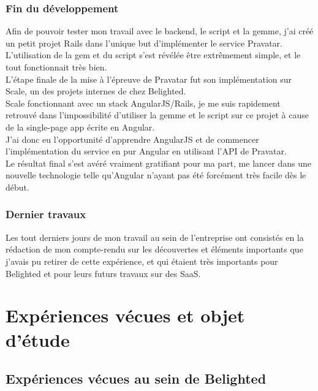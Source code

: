 \documentclass{report}
\begin{document}
    \subsection{Fin du développement}
    \label{sub:Fin du développement}

      Afin de pouvoir tester mon travail avec le backend, le script et la gemme, j'ai créé un petit projet Rails dans l'unique but d'implémenter le service Pravatar.\\
      L'utilisation de la gem et du script s'est révélée être extrêmement simple, et le tout fonctionnait très bien.\\

      L'étape finale de la mise à l'épreuve de Pravatar fut son implémentation sur Scale, un des projets internes de chez Belighted.\\
      Scale fonctionnant avec un stack AngularJS/Rails, je me suis rapidement retrouvé dans l'impossibilité d'utiliser la gemme et le script sur ce projet à cause de la single-page app écrite en Angular.\\
      J'ai donc eu l'opportunité d'apprendre AngularJS et de commencer l'implémentation du service en pur Angular en utilisant l'API de Pravatar.\\
      Le résultat final s'est avéré vraiment gratifiant pour ma part, me lancer dans une nouvelle technologie telle qu'Angular n'ayant pas été forcément très facile dès le début.\\

    \subsection{Dernier travaux}
    \label{sub:Dernier travaux}

      Les tout derniers jours de mon travail au sein de l'entreprise ont consistés en la rédaction de mon compte-rendu sur les découvertes et éléments importants que j'avais pu retirer de cette expérience,
      et qui étaient très importants pour Belighted et pour leurs futurs travaux sur des SaaS.


\chapter{Expériences vécues et objet d'étude}

  \section{Expériences vécues au sein de Belighted}
\end{document}
